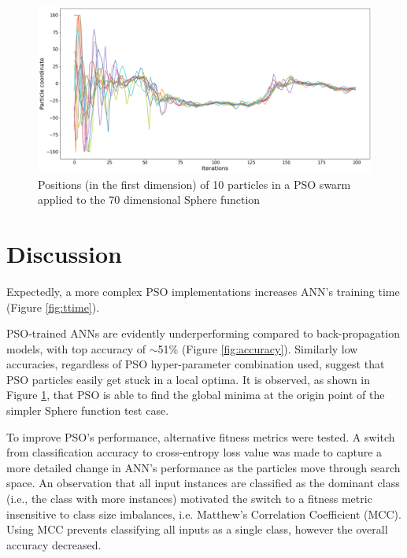 \documentclass[12pt]{article}
\begin{document}
\begin{figure}[H]
  \centering
  \includegraphics[width=1\textwidth]{figs/sphere_pso.png}
  \caption{Positions (in the first dimension) of 10 particles in a PSO swarm applied to the 70 dimensional Sphere function}
  \label{fig:sphere}
\end{figure}

\vspace{-1.5em}
\section{Discussion}
\vspace{-1.5em}

Expectedly, a more complex PSO implementations increases ANN's training time (Figure \ref{fig:ttime}).

PSO-trained ANNs are evidently underperforming compared to back-propagation models, with top accuracy of $\sim$51\% (Figure \ref{fig:accuracy}). Similarly low accuracies, regardless of PSO hyper-parameter combination used, suggest that PSO particles easily get stuck in a local optima. It is observed, as shown in Figure \ref{fig:sphere}, that PSO is able to find the global minima at the origin point of the simpler Sphere function test case.

To improve PSO's performance, alternative fitness metrics were tested. A switch from classification accuracy to cross-entropy loss value was made to capture a more detailed change in ANN's performance as the particles move through search space.  An observation that all input instances are classified as the dominant class (i.e., the class with more instances) motivated the switch to a fitness metric insensitive to class size  imbalances, i.e. Matthew's Correlation Coefficient (MCC). Using MCC prevents classifying all inputs as a single class, however the overall accuracy decreased.
\end{document}

